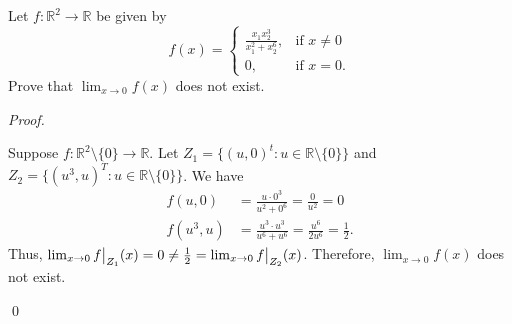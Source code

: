 \documentclass[12pt]{article}
\newenvironment{problem}[2][Problem]{\begin{trivlist}
\item[\hskip \labelsep {\bfseries #1}\hskip \labelsep {\bfseries
#2.}]}{\end{trivlist}}
\newenvironment{sol}
    {\emph{Proof.}
    }
    {
    \qed
    }
\newcommand\restr[2]{{%
  \left.\kern-\nulldelimiterspace %
  #1 %
  \vphantom{\big|} %
  \right|_{#2} %
  }}
\begin{document}
\begin{problem}{2}
Let $f : \mathbb{R}^2 \to \mathbb{R}$ be given by $$f(x) = \begin{cases} 
  \frac{x_1x_2^3}{x_1^2 + x_2^6}, & \text{if } x \neq 0 \\
  0, & \text{if } x = 0.
\end{cases}
$$ Prove that $\lim_{x \to 0} f(x)$ does not exist.
\end{problem}
\begin{sol}
Suppose $f : \mathbb{R}^2 \setminus \{0\} \to \mathbb{R}$. Let $Z_1 = \{(u,0)^t : u \in \mathbb{R} \setminus \{0\}\}$ and $Z_2 = \{(u^3, u)^T : u \in \mathbb{R} \setminus \{0\}\}$. We have 
\begin{align*} f(u,0) &= \frac{u \cdot 0^3}{u^2 + 0^6} = \frac{0}{u^2} = 0 \\ f(u^3,u) &= \frac{u^3 \cdot u^3}{u^6 + u^6} = \frac{u^6}{2u^6} = \frac{1}{2}.
\end{align*} Thus, $\lim_{x \to 0} \restr{f}{Z_1}(x) = 0 \neq \frac{1}{2} = \lim_{x \to 0} \restr{f}{Z_2}(x)$. Therefore, $\lim_{x \to 0} f(x)$ does not exist.
\end{sol}
\end{document}
